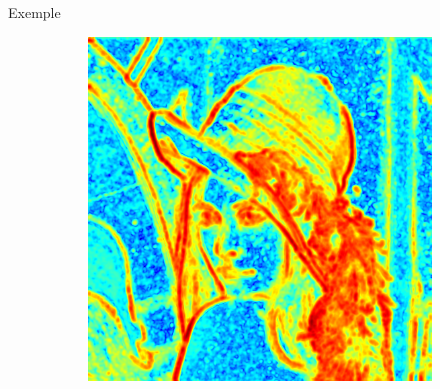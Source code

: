 \documentclass{beamer}
\begin{document}
\begin{frame}
\begin{exampleblock}{Exemple}
\begin{figure}[h]
\begin{subfigure}{0.4\textwidth}
                \includegraphics[width=\textwidth]{img/lena_distanceMap}
                \caption{}
            \end{subfigure}
            \hfill
        \end{figure}
    \end{exampleblock}
\end{frame}
\end{document}

